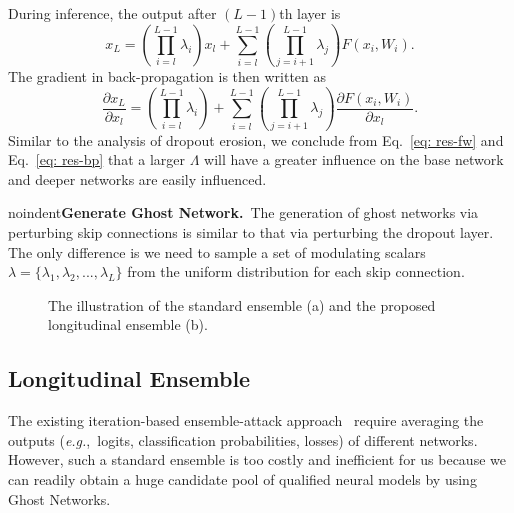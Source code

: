 \documentclass[letterpaper]{article} %
\def\eg{\emph{e.g.}}
\begin{document}
During inference, the output after $(L-1)$th layer is
\begin{equation}\label{eq: res-fw}
x_L=(\prod_{i=l}^{L-1}\lambda_i)x_l+\sum_{i=l}^{L-1}(\prod_{j=i+1}^{L-1}\lambda_j)F(x_i,W_i).
\end{equation}
The gradient in back-propagation is then written as
\begin{equation}\label{eq: res-bp}
\frac{\partial x_L}{\partial x_l} = (\prod_{i=l}^{L-1}\lambda_i)+\sum_{i=l}^{L-1} (\prod_{j=i+1}^{L-1}\lambda_j)\frac{\partial F(x_i,W_i)}{\partial{x_l}}.
\end{equation}
Similar to the analysis of dropout erosion, we conclude from Eq.~\eqref{eq: res-fw} and Eq.~\eqref{eq: res-bp} that a larger $\Lambda$ will have a greater influence on the base network and deeper networks are easily influenced.

noindent\textbf{Generate Ghost Network.}~The generation of ghost networks via perturbing skip connections is similar to that via perturbing the dropout layer. The only difference is we need to sample a set of modulating scalars $\lambda=\{\lambda_1,\lambda_2,...,\lambda_L\}$ from the uniform distribution for each skip connection.%

\begin{figure}[tb]
\centering
{}

\caption{The illustration of the standard ensemble (a) and the proposed longitudinal ensemble (b).}
\label{fig:long_method}
\end{figure}

\subsection{Longitudinal Ensemble} \label{sec:longitudinal}
The existing iteration-based ensemble-attack approach~\cite{liu2016delving} require averaging the outputs (\eg,~logits, classification probabilities, losses) of different networks. However, such a standard ensemble is too costly and inefficient for us because we can readily obtain a huge candidate pool of qualified neural models by using Ghost Networks.
\end{document}
